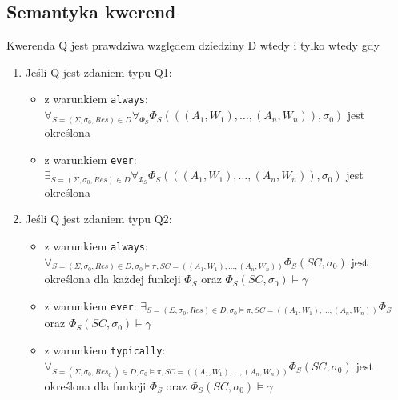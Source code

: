 \documentclass{article}
\begin{document}
\subsection{Semantyka kwerend}
Kwerenda Q jest prawdziwa względem dziedziny D wtedy i tylko wtedy gdy
\begin{enumerate}
	\item Jeśli Q jest zdaniem typu Q1:
	\begin{itemize}
		\item z warunkiem \texttt{always}: $\forall_{S=(\Sigma, \sigma_{0}, Res) \in D}\forall_{\Phi_{S}} \Phi_{S}(((A_{1}, W_{1}), \dots, (A_{n}, W_{n})), \sigma_{0})$ jest określona
		\item z warunkiem \texttt{ever}: 
		$\exists_{S=(\Sigma, \sigma_{0}, Res) \in D}\forall_{\Phi_{S}} \Phi_{S}(((A_{1}, W_{1}), \dots, (A_{n}, W_{n})), \sigma_{0})$ jest określona
	\end{itemize}
	\item Jeśli Q jest zdaniem typu Q2:
	\begin{itemize}
		\item z warunkiem \texttt{always}: 
		$\forall_{S=(\Sigma, \sigma_{0}, Res) \in D, \sigma_{0} \models \pi, SC=((A_{1}, W_{1}), \dots, (A_{n}, W_{n}))} \Phi_{S}(SC, \sigma_{0})$ jest określona dla każdej funkcji $\Phi_{S}$ oraz $\Phi_{S}(SC, \sigma_{0}) \models \gamma$
		\item z warunkiem \texttt{ever}:
		$\exists_{S=(\Sigma, \sigma_{0}, Res) \in D, \sigma_{0} \models \pi, SC=((A_{1}, W_{1}), \dots, (A_{n}, W_{n}))} \Phi_{S}$ oraz $\Phi_{S}(SC, \sigma_{0}) \models \gamma$
		\item z warunkiem \texttt{typically}:
		$\forall_{S=(\Sigma, \sigma_{0}, Res_{0}^{+}) \in D, \sigma_{0} \models \pi, SC=((A_{1}, W_{1}), \dots, (A_{n}, W_{n}))} \Phi_{S}(SC, \sigma_{0})$ jest określona dla funkcji $\Phi_{S}$ oraz $\Phi_{S}(SC, \sigma_{0}) \models \gamma$
	\end{itemize}
	

\end{enumerate}
\end{document}

